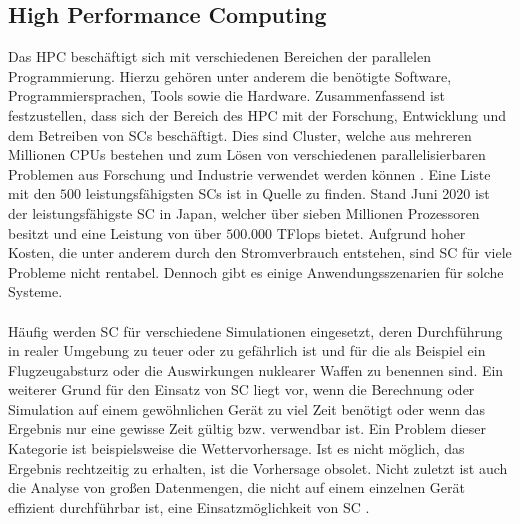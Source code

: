 \subsection{High Performance Computing}
Das \ac{HPC} beschäftigt sich mit verschiedenen Bereichen der parallelen Programmierung. Hierzu gehören unter anderem die benötigte Software, Programmiersprachen, Tools sowie die Hardware. Zusammenfassend ist festzustellen, dass sich der Bereich des \ac{HPC} mit der Forschung, Entwicklung und dem Betreiben von \acp{SC} beschäftigt. Dies sind Cluster, welche aus mehreren Millionen \acp{CPU} bestehen und zum Lösen von verschiedenen parallelisierbaren Problemen aus Forschung und Industrie verwendet werden können \cite{nielsen2016introduction}. Eine Liste mit den $500$ leistungsfähigsten \acp{SC} ist in Quelle \cite{top500} zu finden. Stand Juni 2020 ist der leistungsfähigste \ac{SC} in Japan, welcher über sieben Millionen Prozessoren besitzt und eine Leistung von über $500.000$ TFlops bietet. Aufgrund hoher Kosten, die unter anderem durch den Stromverbrauch entstehen, sind \ac{SC} für viele Probleme nicht rentabel. Dennoch gibt es einige Anwendungsszenarien für solche Systeme.
\\\\
Häufig werden \ac{SC} für verschiedene Simulationen eingesetzt, deren Durchführung in realer Umgebung zu teuer oder zu gefährlich ist und für die als Beispiel ein Flugzeugabsturz oder die Auswirkungen nuklearer Waffen zu benennen sind. Ein weiterer Grund für den Einsatz von SC liegt vor, wenn die Berechnung oder Simulation auf einem gewöhnlichen Gerät zu viel Zeit benötigt oder wenn das Ergebnis nur eine gewisse Zeit gültig bzw. verwendbar ist. Ein Problem dieser Kategorie ist beispielsweise die Wettervorhersage. Ist es nicht möglich, das Ergebnis rechtzeitig zu erhalten, ist die Vorhersage obsolet. Nicht zuletzt ist auch die Analyse von großen Datenmengen, die nicht auf einem einzelnen Gerät effizient durchführbar ist, eine Einsatzmöglichkeit von \ac{SC} \cite{nielsen2016introduction}.

